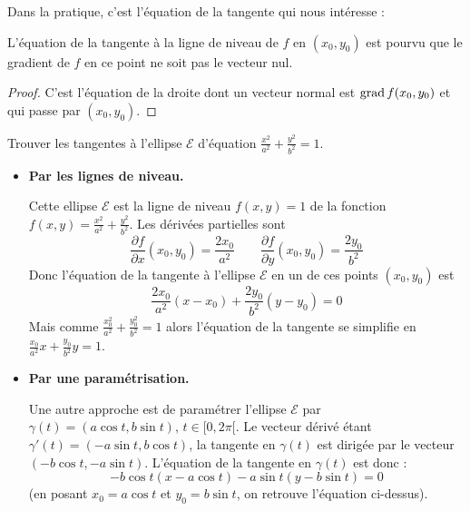 \documentclass[12pt, class=report,crop=false]{standalone}
\begin{document}
Dans la pratique, c'est l'équation de la tangente qui nous intéresse :

\begin{proposition}
L'équation de la tangente à la ligne de niveau de $f$ en $(x_0,y_0)$ est 
pourvu que le gradient de $f$ en ce point ne soit pas le vecteur nul.
\end{proposition}

\begin{proof}
C'est l'équation de la droite dont un vecteur normal est $\operatorname{grad} f(x_0,y_0)$ et qui passe par $(x_0,y_0)$.
\end{proof}


\begin{exemple}
Trouver les tangentes à l'ellipse $\mathcal{E}$ d'équation $\frac{x^2}{a^2}+\frac{y^2}{b^2} = 1$.



\begin{itemize}
  \item \textbf{Par les lignes de niveau.} 
  
  Cette ellipse $\mathcal{E}$ est la ligne de niveau $f(x,y)=1$ de la fonction
  $f(x,y) = \frac{x^2}{a^2}+\frac{y^2}{b^2}$. 
  Les dérivées partielles sont
  $$\frac{\partial f}{\partial x}(x_0,y_0) = \frac{2x_0}{a^2} \qquad
\frac{\partial f}{\partial y}(x_0,y_0) = \frac{2y_0}{b^2}$$
  Donc l'équation de la tangente à l'ellipse $\mathcal{E}$ en un de ces points $(x_0,y_0)$ est
  $$\frac{2x_0}{a^2}(x-x_0)+\frac{2y_0}{b^2}(y-y_0)=0 $$
  Mais comme $\frac{x_0^2}{a^2}+\frac{y_0^2}{b^2} = 1$ alors l'équation de la tangente se simplifie en $\displaystyle \frac{x_0}{a^2}x + \frac{y_0}{b^2} y = 1$.
  
  \item \textbf{Par une paramétrisation.}
  
  Une autre approche est de paramétrer l'ellipse $\mathcal{E}$ par 
  $\gamma(t) = (a \cos t, b \sin t)$, $t \in [0,2\pi[$.
  Le vecteur dérivé étant $\gamma'(t) = (-a \sin t, b \cos t)$, la tangente
  en $\gamma(t)$ est dirigée par le vecteur $(-b \cos t,-a \sin t)$.
  L'équation de la tangente en $\gamma(t)$ est donc :
  $$-b \cos t (x - a \cos t) -a\sin t (y - b\sin t) = 0$$
  (en posant $x_0 = a \cos t$ et $y_0 = b \sin t$, on retrouve l'équation ci-dessus).

\end{itemize}
\end{exemple}
\end{document}
